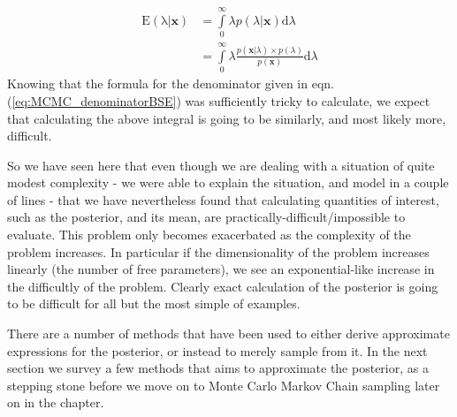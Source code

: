 \documentclass[11pt,fullpage]{book}
\begin{document}
%
\begin{equation}
\begin{align}
\mathrm{E(\lambda|\boldsymbol{x})} &= \int\limits_{0}^{\infty} \lambda p(\lambda|\boldsymbol{x}) \mathrm{d}\lambda\\
&= \int\limits_{0}^{\infty} \lambda \frac{p(\boldsymbol{x}|\lambda)\times p(\lambda)}{p(\boldsymbol{x})} \mathrm{d}\lambda
\end{align}
\end{equation}
%
Knowing that the formula for the denominator given in eqn. (\ref{eq:MCMC_denominatorBSE}) was sufficiently tricky to calculate, we expect that calculating the above integral is going to be similarly, and most likely more, difficult. 

So we have seen here that even though we are dealing with a situation of quite modest complexity - we were able to explain the situation, and model in a couple of lines - that we have nevertheless found that calculating quantities of interest, such as the posterior, and its mean, are practically-difficult/impossible to evaluate. This problem only becomes exacerbated as the complexity of the problem increases. In particular if the dimensionality of the problem increases linearly (the number of free parameters), we see an exponential-like increase in the difficultly of the problem. Clearly exact calculation of the posterior is going to be difficult for all but the most simple of examples.

There are a number of methods that have been used to either derive approximate expressions for the posterior, or instead to merely sample from it. In the next section we survey a few methods that aims to approximate the posterior, as a stepping stone before we move on to Monte Carlo Markov Chain sampling later on in the chapter.
\end{document}
